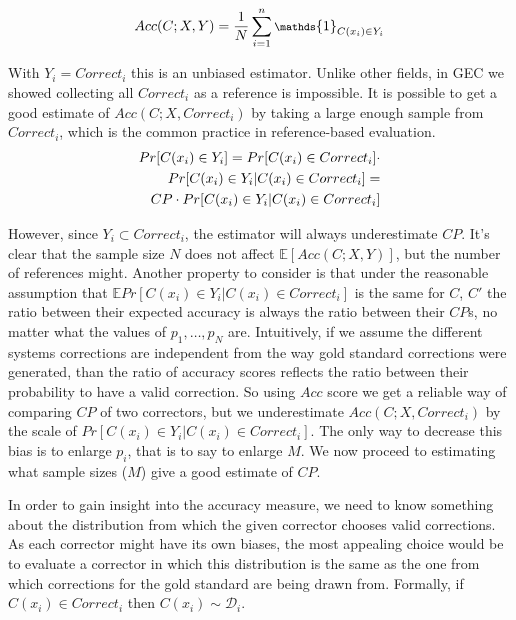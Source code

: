 		\begin{equation}
		\footnotesize
		Acc(C;X,Y) = \frac{1}{N} \sum_{i=1}^n \mathds{1}_{C(x_i) \in Y_i}
		\end{equation}
		
		With $Y_i=Correct_i$ this is an unbiased estimator. Unlike other fields, in GEC we showed collecting all $Correct_i$ as a reference is impossible. It is possible to get a good estimate of $Acc(C;X,Correct_i)$
		by taking a large enough sample from $Correct_i$, which is the common practice in reference-based evaluation.
		\begin{align}\label{eq:correction-in-gs}
		\footnotesize
		Pr[C(x_i) \in Y_i] = Pr[C(x_i) \in Correct_i] \cdot \\
		Pr[C(x_i) \in Y_i | C(x_i) \in Correct_i] = \nonumber \\
		CP\cdot Pr[C(x_i) \in Y_i | C(x_i) \in Correct_i]\nonumber
		\end{align}
		
		However, since $Y_i \subset Correct_i$, the estimator will always underestimate $CP$.
		It's clear that the sample size $N$ does not affect $\mathbb{E}[Acc(C;X,Y)]$, but the number of references
		might. Another property to consider is that under the reasonable assumption that $\mathbb{E}Pr[C(x_i) \in Y_i | C(x_i) \in Correct_i]$ is the same for $C$, $C'$ the ratio between their expected accuracy
		is always the ratio between their $CP$s, no matter what the values of $p_1,\ldots,p_N$ are. Intuitively, if we assume the different systems corrections are independent from the way gold standard corrections were generated, than the ratio of accuracy scores reflects the ratio between their probability to have a valid correction.
		So using $Acc$ score we get a reliable way of comparing $CP$ of two correctors,
		but we underestimate $Acc\left(C;X,Correct_i\right)$ by the scale of $Pr\left[C\left(x_i\right) \in Y_i | C\left(x_i\right) \in Correct_i\right]$. The only way to decrease this bias
		is to enlarge $p_i$, that is to say to enlarge $M$. 
		We now proceed to estimating what sample sizes ($M$) give a good estimate of $CP$.
		
		In order to gain insight into the accuracy measure, we need to know something about the distribution from which the given corrector chooses valid corrections. As each corrector might have its own biases, the most appealing choice would be to evaluate a corrector in which this distribution is the same as the one from which corrections for the gold standard are being drawn from. Formally, if $C\left(x_i\right) \in Correct_i$ then $C\left(x_i\right) \sim \mathcal{D}_i$. 
		
